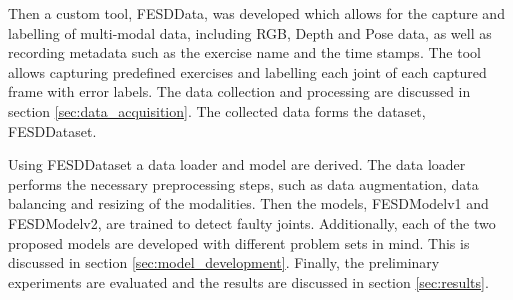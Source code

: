 Then a custom tool, FESDData, was developed which allows for the capture and labelling of multi-modal data, including RGB, Depth and Pose data, as well as recording metadata such as the exercise name and the time stamps. The tool allows capturing predefined exercises and labelling each joint of each captured frame with error labels. The data collection and processing are discussed in section \ref{sec:data_acquisition}. The collected data forms the dataset, FESDDataset.

Using FESDDataset a data loader and model are derived. The data loader performs the necessary preprocessing steps, such as data augmentation, data balancing and resizing of the modalities. Then the models, FESDModelv1 and FESDModelv2, are trained to detect faulty joints. Additionally, each of the two proposed models are developed with different problem sets in mind. This is discussed in section \ref{sec:model_development}. Finally, the preliminary experiments are evaluated and the results are discussed in section \ref{sec:results}.

